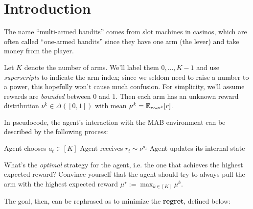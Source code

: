 \documentclass[\main/main]{subfiles}
\begin{document}
\section{Introduction}

The name ``multi-armed bandits'' comes from slot machines in casinos, which are often called ``one-armed bandits'' since they have one arm (the lever) and take money from the player.

Let $K$ denote the number of arms. We'll label them $0, \dots, K-1$ and use \emph{superscripts} to indicate the arm index; since we seldom need to raise a number to a power, this hopefully won't cause much confusion. For simplicity, we'll assume rewards are \emph{bounded} between $0$ and $1$. Then each arm has an unknown reward distribution $\nu^k \in \Delta([0, 1])$ with mean $\mu^k = \operatorname*{\mathbb{E}}_{r \sim \nu^k} [r]$.

In pseudocode, the agent's interaction with the MAB environment can be described by the following process:

\begin{algorithmic}
    \State Agent chooses $a_t \in [K]$
    \State Agent receives $r_t \sim \nu^{a_t}$
    \State Agent updates its internal state
\EndFor
\end{algorithmic}

What's the \emph{optimal} strategy for the agent, i.e. the one that achieves the highest expected reward? Convince yourself that the agent should try to always pull the arm with the highest expected reward $\mu^\star := \max_{k \in [K]} \mu^k$.

The goal, then, can be rephrased as to minimize the \textbf{regret}, defined below:
\end{document}
